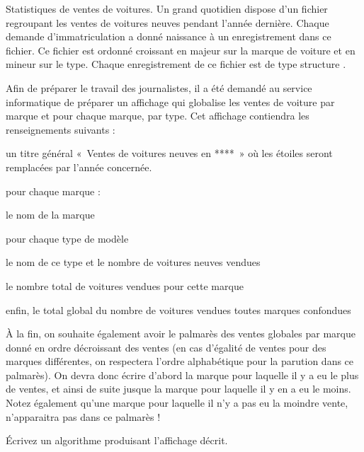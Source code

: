 \begin{Exercice}{Statistiques de ventes de voitures.}
	Un grand quotidien dispose d’un fichier  regroupant les ventes de
	voitures neuves pendant l’année dernière. Chaque demande
	d’immatriculation a donné naissance à un enregistrement dans ce
	fichier. Ce fichier est ordonné croissant en majeur sur la marque de
	voiture et en mineur sur le type. Chaque enregistrement de ce fichier
	est de type structure .


	Afin de préparer le travail des journalistes, il a été demandé au
	service informatique de préparer un affichage qui globalise les ventes
	de voiture par marque et pour chaque marque, par type. Cet affichage
	contiendra les renseignements suivants :

	\begin{liste}
		\item 
			un titre général «~Ventes de voitures neuves en ****~» où les étoiles
			seront remplacées par l’année concernée.
		\item 
			pour chaque marque :
			\begin{liste}
				\item 
					le nom de la marque
				\item 
					pour chaque type de modèle
				\item 
					le nom de ce type et le nombre de voitures neuves vendues
				\item 
					le nombre total de voitures vendues pour cette marque
			\end{liste}
		\item 
			enfin, le total global du nombre de voitures vendues toutes marques
			confondues
	\end{liste}
	
	À la fin, on souhaite également avoir le palmarès des ventes globales
	par marque donné en ordre décroissant des ventes (en cas d’égalité de
	ventes pour des marques différentes, on respectera l’ordre alphabétique
	pour la parution dans ce palmarès). On devra donc écrire d’abord la
	marque pour laquelle il y a eu le plus de ventes, et ainsi de suite
	jusque la marque pour laquelle il y en a eu le moins. Notez également
	qu’une marque pour laquelle il n’y a pas eu la moindre vente,
	n’apparaitra pas dans ce palmarès !

	Écrivez un algorithme produisant l'affichage décrit.
\end{Exercice}

